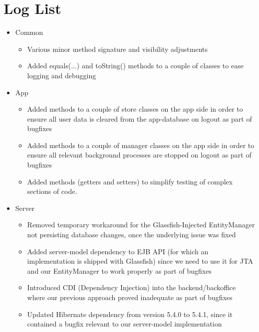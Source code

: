 \chapter{Log List}

\begin{itemize}
	\item Common \begin{itemize}
		\item Various minor method signature and visibility adjustments
		\item Added equals(...) and toString() methods to a couple of classes to ease logging and debugging
	\end{itemize}
	\item App \begin{itemize}
		\item Added methods to a couple of store classes on the app side in order to ensure all user data is cleared from the app-database on logout as part of bugfixes
		\item Added methods to a couple of manager classes on the app side in order to ensure all relevant background processes are stopped on logout as part of bugfixes
		\item Added methods (getters and setters) to simplify testing of complex sections of code.
	\end{itemize}
	\item Server \begin{itemize}
		\item Removed temporary workaround for the Glassfish-Injected EntityManager not persisting database changes, once the underlying issue was fixed
		\item Added server-model dependency to EJB API (for which an implementation is shipped with Glassfish) since we need to use it for JTA and our EntityManager to work properly as part of bugfixes
		\item Introduced CDI (Dependency Injection) into the backend/backoffice where our previous approach proved inadequate as part of bugfixes
		\item Updated Hibernate dependency from version 5.4.0 to 5.4.1, since it contained a bugfix relevant to our server-model implementation
	\end{itemize}
\end{itemize}
